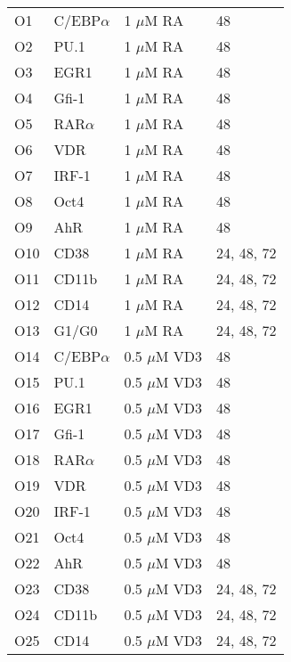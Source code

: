 

\begin{center}
\label{Leukemia_TF_objective}
\begin{scriptsize}
\begin{supertabular}{|p{2cm}|p{3cm}|p{3cm}|p{3cm}|}  
\hline											
O1 & C/EBP$\alpha$ & 1 $\mu$M RA & 48 \\
O2 &  PU.1 & 1 $\mu$M RA & 48 \\
O3 &  EGR1 & 1 $\mu$M RA & 48 \\
O4 &  Gfi-1 & 1 $\mu$M RA & 48 \\
O5 &  RAR$\alpha$ & 1 $\mu$M RA & 48 \\
O6 &  VDR & 1 $\mu$M RA & 48 \\
O7 &  IRF-1 & 1 $\mu$M RA & 48 \\
O8 &  Oct4 & 1 $\mu$M RA & 48 \\
O9 &  AhR & 1 $\mu$M RA & 48 \\
O10 & CD38 & 1 $\mu$M RA & 24, 48, 72 \\
O11 &  CD11b & 1 $\mu$M RA & 24, 48, 72 \\
O12 &  CD14 & 1 $\mu$M RA & 24, 48, 72 \\
O13 &  G1/G0 & 1 $\mu$M RA & 24, 48, 72 \\
O14 & C/EBP$\alpha$ & 0.5 $\mu$M VD3 & 48 \\
O15 &  PU.1 & 0.5 $\mu$M VD3 & 48 \\
O16 &  EGR1 & 0.5 $\mu$M VD3 & 48 \\
O17 &  Gfi-1 & 0.5 $\mu$M VD3 & 48 \\
O18 &  RAR$\alpha$ & 0.5 $\mu$M VD3 & 48 \\
O19 &  VDR & 0.5 $\mu$M VD3 & 48 \\
O20 &  IRF-1 & 0.5 $\mu$M VD3 & 48 \\
O21 &  Oct4 & 0.5 $\mu$M VD3 & 48 \\
O22 &  AhR & 0.5 $\mu$M VD3 & 48 \\
O23 & CD38 & 0.5 $\mu$M VD3 & 24, 48, 72 \\
O24 &  CD11b & 0.5 $\mu$M VD3 & 24, 48, 72 \\
O25 &  CD14 & 0.5 $\mu$M VD3 & 24, 48, 72 \\

\end{supertabular}
\end{scriptsize}
\end{center}
